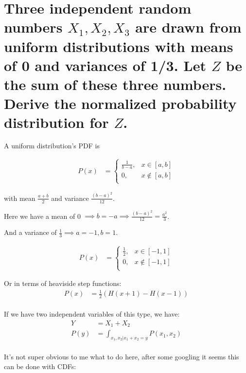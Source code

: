 \section{Three independent random numbers
\texorpdfstring{$X_1, X_2, X_3$}{X1, X2, X3} are drawn
from uniform distributions with means of 0 and variances of 1/3.
Let \texorpdfstring{$Z$}{Z} be the sum of these three numbers.
Derive the normalized probability distribution for \texorpdfstring{$Z$}{Z}.}

A uniform distribution's PDF is

\begin{align*}
    P(x) &= \left\{ 
        \begin{matrix}
            \frac{1}{b-a},& x \in [a,b]\\
            0,& x \notin [a,b]\\
        \end{matrix}
    \right.
\end{align*}

with mean $\frac{a+b}{2}$ and variance $\frac{(b-a)^2}{12}$.

Here we have a mean of 0 $\implies b=-a \implies \frac{(b-a)^2}{12} = \frac{a^2}{3}$.

And a variance of $\frac{1}{3} \implies a = -1, b = 1$.

\begin{align*}
    P(x) &= \left\{ 
        \begin{matrix}
            \frac{1}{2},& x \in [-1,1]\\
            0,& x \notin [-1,1]\\
        \end{matrix}
    \right.
\end{align*}

Or in terms of heaviside step functions:
\begin{align*}
    P(x) &= \frac{1}{2}(H(x+1) - H(x-1)) \\
\end{align*}


If we have two independent variables of this type, we have:
\begin{align*}
    Y &= X_1 + X_2 \\
    P(y) &= \int_{x_1, x_2 | x_1+x_2=y} P(x_1, x_2) \\
\end{align*}

It's not super obvious to me what to do here, after some googling it seems this
can be done with CDFs:

